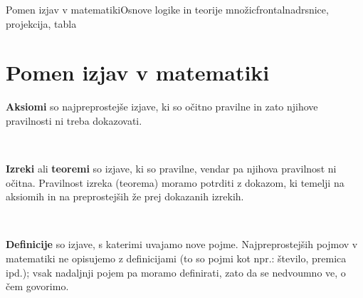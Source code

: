 \begin{priprava}{6}{}{Pomen izjav v matematiki}{Osnove logike in teorije množic}{frontalna}{drsnice, projekcija, tabla}


    \section{Pomen izjav v matematiki}
              
    \textbf{Aksiomi} so najpreprostejše izjave, ki so očitno pravilne in zato njihove 
    pravilnosti ni treba dokazovati.
 
    ~
  
    \textbf{Izreki} ali \textbf{teoremi} so izjave, ki so pravilne, vendar pa njihova 
    pravilnost ni očitna. 
    Pravilnost izreka (teorema) moramo potrditi z dokazom, ki temelji na aksiomih in na 
    preprostejših že prej dokazanih izrekih.
 
    ~
  
    \textbf{Definicije} so izjave, s katerimi uvajamo nove pojme. Najpreprostejših pojmov 
    v matematiki ne opisujemo z definicijami (to so pojmi kot npr.: število, premica ipd.); 
    vsak nadaljnji pojem pa moramo definirati, zato da se nedvoumno ve, o čem govorimo.
 


\end{priprava}